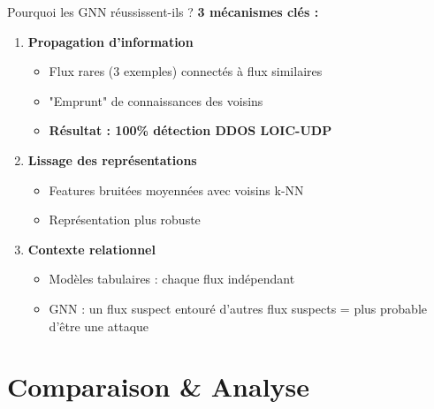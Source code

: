 ﻿\documentclass[aspectratio=169]{beamer}
\begin{document}
\begin{frame}{Pourquoi les GNN réussissent-ils ?}
\textbf{3 mécanismes clés :}

\vspace{0.5cm}

\begin{enumerate}
    \item \textbf{Propagation d'information}
    \begin{itemize}
        \item Flux rares (3 exemples) connectés à flux similaires
        \item "Emprunt" de connaissances des voisins
        \item \textcolor{accentorange}{\textbf{Résultat : 100\% détection DDOS LOIC-UDP}}
    \end{itemize}
    
    \vspace{0.3cm}
    
    \item \textbf{Lissage des représentations}
    \begin{itemize}
        \item Features bruitées moyennées avec voisins k-NN
        \item Représentation plus robuste
    \end{itemize}
    
    \vspace{0.3cm}
    
    \item \textbf{Contexte relationnel}
    \begin{itemize}
        \item Modèles tabulaires : chaque flux indépendant
        \item GNN : un flux suspect entouré d'autres flux suspects = plus probable d'être une attaque
    \end{itemize}
\end{enumerate}
\end{frame}

\section{Comparaison \& Analyse}
\end{document}
